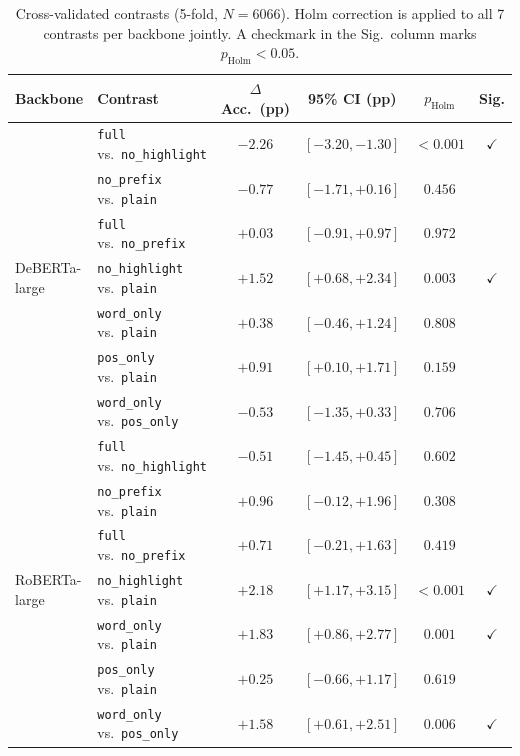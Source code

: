 \documentclass[runningheads]{llncs}
\begin{document}
\begin{table}[t]
\centering
\caption{Cross-validated contrasts (5-fold, $N = 6066$). Holm correction is
applied to all 7 contrasts per backbone jointly. A checkmark in the Sig.\
column marks $p_{\text{Holm}} < 0.05$.}
\label{tab:cv_stats}
\footnotesize
\begin{tabular}{llcccc}
\toprule
Backbone & Contrast & $\Delta$ Acc.\ (pp) & 95\% CI (pp) & $p_{\text{Holm}}$ & Sig.\\
\midrule
\multirow{7}{*}{DeBERTa-large}
 & \texttt{full} vs.\ \texttt{no\_highlight} & $-2.26$ & $[-3.20, -1.30]$ & $<0.001$ & $\checkmark$\\
 & \texttt{no\_prefix} vs.\ \texttt{plain}   & $-0.77$ & $[-1.71, +0.16]$ & $0.456$ & \\
 & \texttt{full} vs.\ \texttt{no\_prefix}    & $+0.03$ & $[-0.91, +0.97]$ & $0.972$ & \\
 & \texttt{no\_highlight} vs.\ \texttt{plain}& $+1.52$ & $[+0.68, +2.34]$ & $0.003$ & $\checkmark$\\
 & \texttt{word\_only} vs.\ \texttt{plain}   & $+0.38$ & $[-0.46, +1.24]$ & $0.808$ & \\
 & \texttt{pos\_only} vs.\ \texttt{plain}    & $+0.91$ & $[+0.10, +1.71]$ & $0.159$ & \\
 & \texttt{word\_only} vs.\ \texttt{pos\_only}& $-0.53$ & $[-1.35, +0.33]$ & $0.706$ & \\
\midrule
\multirow{7}{*}{RoBERTa-large}
 & \texttt{full} vs.\ \texttt{no\_highlight} & $-0.51$ & $[-1.45, +0.45]$ & $0.602$ & \\
 & \texttt{no\_prefix} vs.\ \texttt{plain}   & $+0.96$ & $[-0.12, +1.96]$ & $0.308$ & \\
 & \texttt{full} vs.\ \texttt{no\_prefix}    & $+0.71$ & $[-0.21, +1.63]$ & $0.419$ & \\
 & \texttt{no\_highlight} vs.\ \texttt{plain}& $+2.18$ & $[+1.17, +3.15]$ & $<0.001$ & $\checkmark$\\
 & \texttt{word\_only} vs.\ \texttt{plain}   & $+1.83$ & $[+0.86, +2.77]$ & $0.001$ & $\checkmark$\\
 & \texttt{pos\_only} vs.\ \texttt{plain}    & $+0.25$ & $[-0.66, +1.17]$ & $0.619$ & \\
 & \texttt{word\_only} vs.\ \texttt{pos\_only}& $+1.58$ & $[+0.61, +2.51]$ & $0.006$ & $\checkmark$\\
\bottomrule
\end{tabular}
\end{table}
\end{document}
